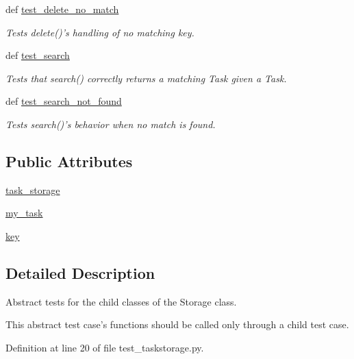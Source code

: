 \begin{DoxyCompactItemize}
def \hyperlink{classtest__taskstorage_1_1TestStorage_a4eb39b2d44a6e283b5aa7fec7878a351}{test\-\_\-delete\-\_\-no\-\_\-match}
\begin{DoxyCompactList}\small\item\em \-Tests delete()'s handling of no matching key. \end{DoxyCompactList}\item 
def \hyperlink{classtest__taskstorage_1_1TestStorage_aef95d0237de543b3c466c0c0aa185b74}{test\-\_\-search}
\begin{DoxyCompactList}\small\item\em \-Tests that search() correctly returns a matching \-Task given a \-Task. \end{DoxyCompactList}\item 
def \hyperlink{classtest__taskstorage_1_1TestStorage_a5fa544513569dfa9632b5b34b2b30350}{test\-\_\-search\-\_\-not\-\_\-found}
\begin{DoxyCompactList}\small\item\em \-Tests search()'s behavior when no match is found. \end{DoxyCompactList}\end{DoxyCompactItemize}
\subsection*{\-Public \-Attributes}
\begin{DoxyCompactItemize}
\item 
\hyperlink{classtest__taskstorage_1_1TestStorage_a414fec77c1f9ac66b58f26df514fc048}{task\-\_\-storage}
\item 
\hyperlink{classtest__taskstorage_1_1TestStorage_a7d47cd41a51cd29b6f793d373599bd82}{my\-\_\-task}
\item 
\hyperlink{classtest__taskstorage_1_1TestStorage_ab9ddf07c905a5d38f3b48aa17411516e}{key}
\end{DoxyCompactItemize}


\subsection{\-Detailed \-Description}
\-Abstract tests for the child classes of the \-Storage class. 

\-This abstract test case's functions should be called only through a child test case. 

\-Definition at line 20 of file test\-\_\-taskstorage.\-py.



